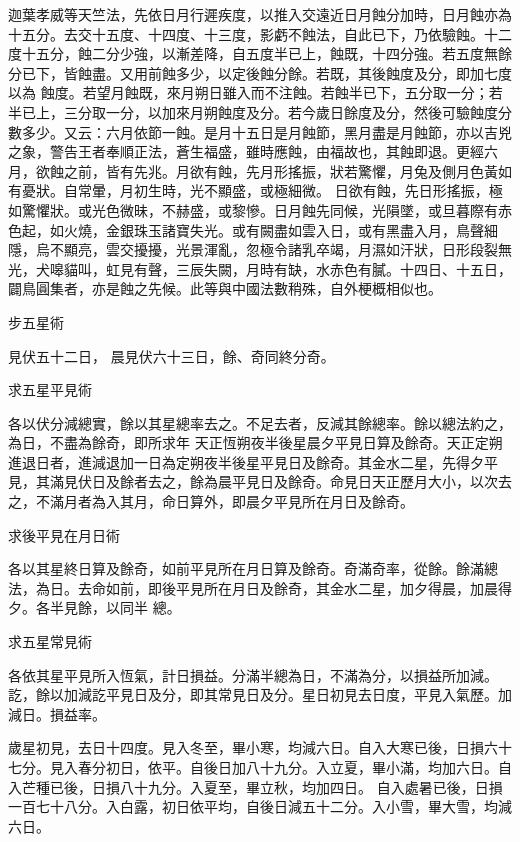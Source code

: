 \begin{pinyinscope}
 迦葉孝威等天竺法，先依日月行遲疾度，以推入交遠近日月蝕分加時，日月蝕亦為十五分。去交十五度、十四度、十三度，影虧不蝕法，自此已下，乃依驗蝕。十二度十五分，蝕二分少強，以漸差降，自五度半已上，蝕既，十四分強。若五度無餘分已下，皆蝕盡。又用前蝕多少，以定後蝕分餘。若既，其後蝕度及分，即加七度以為
 蝕度。若望月蝕既，來月朔日雖入而不注蝕。若蝕半已下，五分取一分；若半已上，三分取一分，以加來月朔蝕度及分。若今歲日餘度及分，然後可驗蝕度分數多少。又云：六月依節一蝕。是月十五日是月蝕節，黑月盡是月蝕節，亦以吉兇之象，警告王者奉順正法，蒼生福盛，雖時應蝕，由福故也，其蝕即退。更經六月，欲蝕之前，皆有先兆。月欲有蝕，先月形搖振，狀若驚懼，月兔及側月色黃如有憂狀。自常暈，月初生時，光不顯盛，或極細微。
 日欲有蝕，先日形搖振，極如驚懼狀。或光色微昧，不赫盛，或黎慘。日月蝕先同候，光隕墜，或旦暮際有赤色起，如火燒，金銀珠玉諸寶失光。或有闕盡如雲入日，或有黑盡入月，鳥聲細隱，烏不顯亮，雲交擾擾，光景渾亂，忽極令諸乳卒竭，月濕如汗狀，日形段裂無光，犬嗥貓叫，虹見有聲，三辰失闕，月時有缺，水赤色有膩。十四日、十五日，闢鳥圓集者，亦是蝕之先候。此等與中國法數稍殊，自外梗概相似也。



 步五星術



 見伏五十二日，
 晨見伏六十三日，餘、奇同終分奇。



 求五星平見術



 各以伏分減總實，餘以其星總率去之。不足去者，反減其餘總率。餘以總法約之，為日，不盡為餘奇，即所求年
 天正恆朔夜半後星晨夕平見日算及餘奇。天正定朔進退日者，進減退加一日為定朔夜半後星平見日及餘奇。其金水二星，先得夕平見，其滿見伏日及餘者去之，餘為晨平見日及餘奇。命見日天正歷月大小，以次去之，不滿月者為入其月，命日算外，即晨夕平見所在月日及餘奇。



 求後平見在月日術



 各以其星終日算及餘奇，如前平見所在月日算及餘奇。奇滿奇率，從餘。餘滿總法，為日。去命如前，即後平見所在月日及餘奇，其金水二星，加夕得晨，加晨得夕。各半見餘，以同半
 總。



 求五星常見術



 各依其星平見所入恆氣，計日損益。分滿半總為日，不滿為分，以損益所加減。訖，餘以加減訖平見日及分，即其常見日及分。星日初見去日度，平見入氣歷。加減日。損益率。



 歲星初見，去日十四度。見入冬至，畢小寒，均減六日。自入大寒已後，日損六十七分。見入春分初日，依平。自後日加八十九分。入立夏，畢小滿，均加六日。自入芒種已後，日損八十九分。入夏至，畢立秋，均加四日。
 自入處暑已後，日損一百七十八分。入白露，初日依平均，自後日減五十二分。入小雪，畢大雪，均減六日。




\end{pinyinscope}
